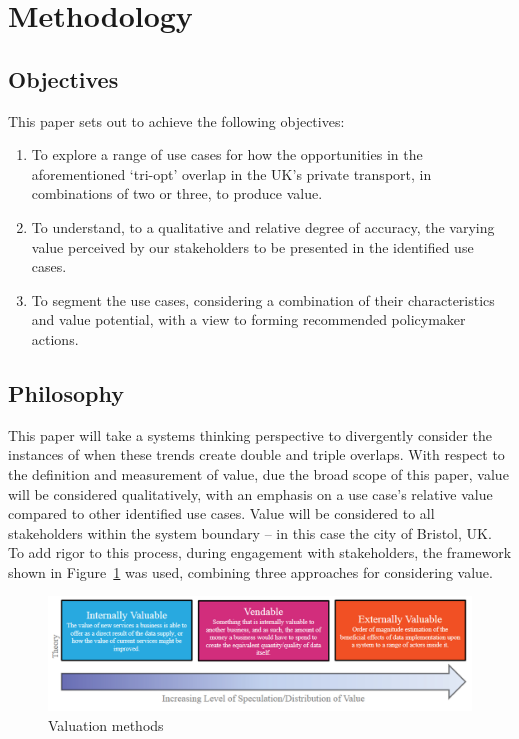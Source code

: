\documentclass[journal]{IEEEtran}
\begin{document}
\section{Methodology}\label{methodology}

\subsection{Objectives}

This paper sets out to achieve the following objectives:

\begin{enumerate}
\item To explore a range of use cases for how the opportunities in the
  aforementioned `tri-opt' overlap in the UK's private transport, in
  combinations of two or three, to produce value.  
\item To understand, to a qualitative and relative degree of accuracy,
  the varying value perceived by our stakeholders to be presented in
  the identified use cases. 
\item To segment the use cases, considering a combination of their
  characteristics and value potential, with a view to forming
  recommended policymaker actions.
\end{enumerate}

\subsection{Philosophy}

This paper will take a systems thinking perspective to divergently
consider the instances of when these trends create double and triple
overlaps. With respect to the definition and measurement of value, due
the broad scope of this paper, value will be considered qualitatively,
with an emphasis on a use case's relative value compared to other
identified use cases. Value will be considered to all stakeholders
within the system boundary -- in this case the city of Bristol, UK. To
add rigor to this process, during engagement with stakeholders, the
framework shown in Figure~\ref{fig:valuationmethods} was used,
combining three approaches for considering value.

\begin{figure}[!htb]
\centering
\includegraphics[width=\columnwidth]{images/valuationmethods.png}
\caption{Valuation methods}
\label{fig:valuationmethods}
\end{figure}
\end{document}
